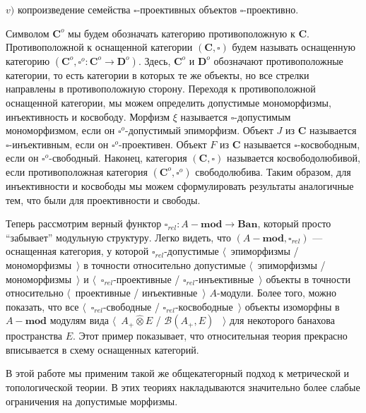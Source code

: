 \documentclass[12pt]{article}
\newcommand{\projtens}{\mathbin{\widehat{\otimes}}}
\begin{document}
$v)$ копроизведение семейства $\square$-проективных объектов $\square$-проективно.

Символом $\mathbf{C}^{o}$ мы будем обозначать категорию противоположную к $\mathbf{C}$. Противоположной к оснащенной категории $(\mathbf{C}, \square)$ 
будем называть оснащенную категорию $(\mathbf{C}^{o},\square^{o}:\mathbf{C}^{o}\to\mathbf{D}^{o})$. Здесь, $\mathbf{C}^o$ и $\mathbf{D}^o$ обозначают противоположные категории, то есть категории в которых  те же объекты, но все стрелки направлены в противоположную сторону. Переходя к противоположной оснащенной категории, мы можем определить допустимые мономорфизмы, инъективность и косвободу. Морфизм $\xi$ называется $\square$-допустимым мономорфизмом, если он $\square^o$-допустимый эпиморфизм. Объект $J$ из $\mathbf{C}$ называется $\square$-инъективным, если он $\square^o$-проективен. Объект $F$ из $\mathbf{C}$ называется $\square$-косвободным, если он $\square^o$-свободный. Наконец, категория $(\mathbf{C}, \square)$ называется косвободолюбивой, если  противоположная категория $(\mathbf{C}^{o},\square^{o})$ свободолюбива. Таким образом, для инъективности и косвободы мы можем сформулировать результаты аналогичные тем, что были для проективности и свободы.

Теперь рассмотрим верный функтор $\square_{rel}:A-\mathbf{mod}\to\mathbf{Ban}$, который просто ``забывает'' модульную структуру. Легко видеть, что $(A-\mathbf{mod},\square_{rel})$ --- оснащенная категория, у которой $\square_{rel}$-допустимые $\langle$~эпиморфизмы / мономорфизмы~$\rangle$ в точности относительно допустимые $\langle$~эпиморфизмы / мономорфизмы~$\rangle$ и $\langle$~$\square_{rel}$-проективные / $\square_{rel}$-инъективные~$\rangle$ объекты в точности относительно $\langle$~проективные / инъективные~$\rangle$ $A$-модули. Более того, можно показать, что все $\langle$~$\square_{rel}$-свободные / $\square_{rel}$-косвободные~$\rangle$ объекты изоморфны в $A-\mathbf{mod}$ модулям вида $\langle$~$A_+\projtens E$ / $\mathcal{B}(A_+,E)$ ~$\rangle$ для некоторого банахова пространства $E$. Этот пример показывает, что относительная теория прекрасно вписывается в схему оснащенных категорий.

В этой работе мы применим такой же общекатегорный подход к метрической и топологической теории. В этих теориях накладываются значительно более слабые ограничения на допустимые морфизмы.

\end{document}
